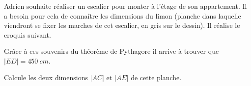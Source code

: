 \begin{exercise}[points=4]
    Adrien souhaite réaliser un escalier pour monter à l'étage de son appartement.
    Il a besoin pour cela de connaître les dimensions du limon (planche dans laquelle viendront se fixer les marches de cet escalier, en gris sur le dessin).
    Il réalise le croquis suivant.
    \begin{center}
        
    \end{center}

    Grâce à ces souvenirs du théorème de Pythagore il arrive à trouver que $|ED|=\SI{450}{cm}$.

    Calcule les deux dimensions $|AC|$ et $|AE|$ de cette planche.
\end{exercise}

%     


    
